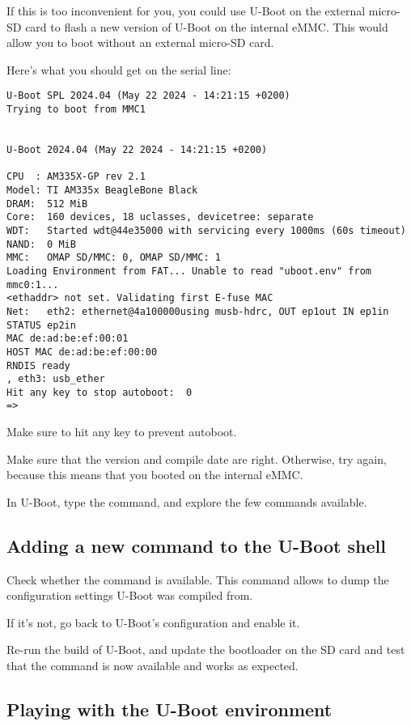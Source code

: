 If this is too inconvenient for you, you could use U-Boot on the
external micro-SD card to flash a new version of U-Boot on the internal
eMMC. This would allow you to boot without an external micro-SD card.

Here's what you should get on the serial line:

\begin{verbatim}
U-Boot SPL 2024.04 (May 22 2024 - 14:21:15 +0200)
Trying to boot from MMC1


U-Boot 2024.04 (May 22 2024 - 14:21:15 +0200)

CPU  : AM335X-GP rev 2.1
Model: TI AM335x BeagleBone Black
DRAM:  512 MiB
Core:  160 devices, 18 uclasses, devicetree: separate
WDT:   Started wdt@44e35000 with servicing every 1000ms (60s timeout)
NAND:  0 MiB
MMC:   OMAP SD/MMC: 0, OMAP SD/MMC: 1
Loading Environment from FAT... Unable to read "uboot.env" from mmc0:1...
<ethaddr> not set. Validating first E-fuse MAC
Net:   eth2: ethernet@4a100000using musb-hdrc, OUT ep1out IN ep1in STATUS ep2in
MAC de:ad:be:ef:00:01
HOST MAC de:ad:be:ef:00:00
RNDIS ready
, eth3: usb_ether
Hit any key to stop autoboot:  0
=>
\end{verbatim}

Make sure to hit any key to prevent autoboot.

Make sure that the version and compile date are right. Otherwise, try
again, because this means that you booted on the internal eMMC.

In U-Boot, type the  command, and explore the few commands
available.

\subsection{Adding a new command to the U-Boot shell}

Check whether the  command is available. This command
allows to dump the configuration settings U-Boot was compiled from.

If it's not, go back to U-Boot's configuration and enable it.

Re-run the build of U-Boot, and update the bootloader on the SD card
and test that the command is now available and works as expected.

\subsection{Playing with the U-Boot environment}

